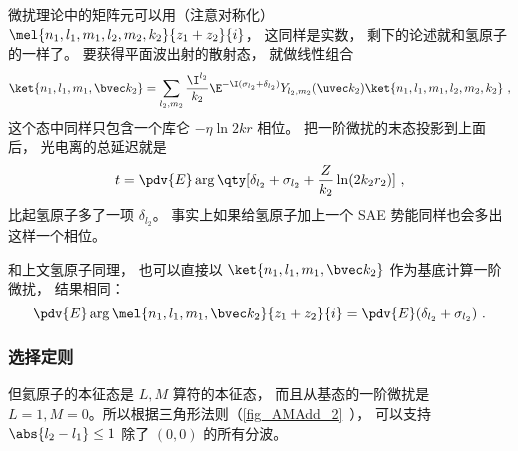 微扰理论中的矩阵元可以用（注意对称化） $\mel{n_1,l_1,m_1, l_2,m_2,k_2}{z_1 + z_2}{i}$， 这同样是实数， 剩下的论述就和氢原子的一样了。 要获得平面波出射的散射态， 就做线性组合
\begin{equation}
\ket{n_1, l_1, m_1, \bvec k_2} = \sum_{l_2,m_2}\frac{\I^{l_2}}{k_2} \E^{-\I(\sigma_{l_2}+\delta_{l_2})} Y_{l_2,m_2} (\uvec k_2) \ket{n_1,l_1,m_1, l_2,m_2,k_2}~,
\end{equation}
这个态中同样只包含一个库仑 $-\eta\ln 2kr$ 相位。 把一阶微扰的末态投影到上面后， 光电离的总延迟就是
\begin{equation}
t = \pdv{E} \arg\qty[\delta_{l_2} + \sigma_{l_2} + \frac{Z}{k_2}\ln(2k_2 r_2)]~, %
\end{equation}
比起氢原子多了一项 $\delta_{l_2}$。 事实上如果给氢原子加上一个 SAE 势能同样也会多出这样一个相位。

和上文氢原子同理， 也可以直接以 $\ket{n_1, l_1, m_1, \bvec k_2}$ 作为基底计算一阶微扰， 结果相同：
\begin{equation}
\pdv{E} \arg\mel{n_1, l_1, m_1, \bvec k_2}{z_1 + z_2}{i} = \pdv{E} (\delta_{l_2} + \sigma_{l_2})~.
\end{equation}

\subsubsection{选择定则}
但氦原子的本征态是 $L,M$ 算符的本征态， 而且从基态的一阶微扰是 $L = 1, M = 0$。所以根据三角形法则（\autoref{fig_AMAdd_2}~）， 可以支持 $\abs{l_2 - l_1} \le 1$ 除了 $(0,0)$ 的所有分波。
